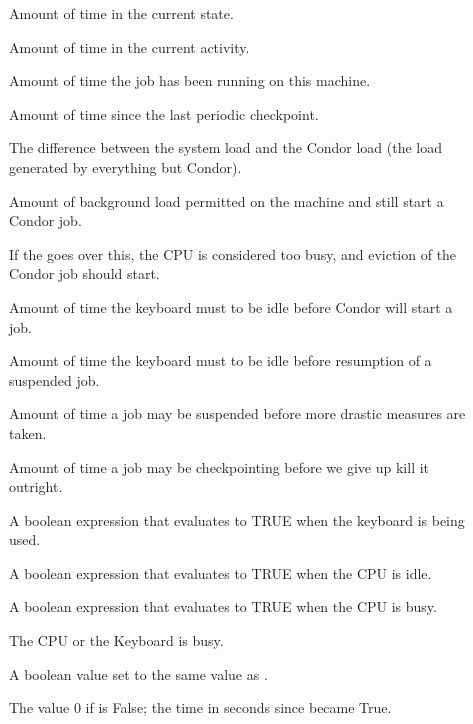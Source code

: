 \begin{description}
  
\item[] Amount of time in the current state.

\item[] Amount of time in the current activity. 

\item[] Amount of time the job has been running on
  this machine.

\item[] Amount of time since the last periodic checkpoint.

\item[] The difference between the system load and
  the Condor load (the load generated by everything but Condor).

\item[] Amount of background load permitted
  on the machine and still start a Condor job.

\item[] If the  goes over
  this, the CPU is considered too busy, and eviction of the Condor
  job should start. 

\item[] Amount of time the keyboard must to be idle
  before Condor will start a job.

\item[] Amount of time the keyboard must to be idle
  before resumption of a suspended job.

\item[] Amount of time a job may be
  suspended before more drastic measures are taken.

\item[] Amount of time a job may be
  checkpointing before we give up kill it outright.

\item[] A boolean expression that evaluates to TRUE
    when the keyboard is being used.

\item[] A boolean expression that evaluates to TRUE
    when the CPU is idle.

\item[] A boolean expression that evaluates
    to TRUE when the CPU is busy.

\item[] The CPU or the Keyboard is busy.

\item[] A boolean value set to the same value as 
    .

\item[] The value 0 if 
    is False; the time in seconds since
     became True.
    
\end{description}

